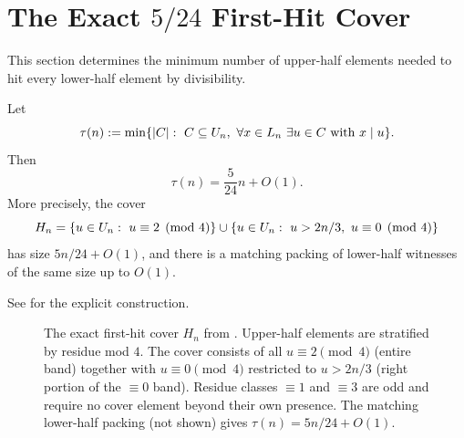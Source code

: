 \section{The Exact \texorpdfstring{$5/24$}{5/24} First-Hit Cover}\label{sec:cover}

This section determines the minimum number of upper-half elements needed to
hit every lower-half element by divisibility.

\begin{theorem}\label{thm:five-twenty-four}
Let
\[
  \tau(n):=\min\{|C|:\ C\subseteq\U_n,\ \forall x\in L_n\ \exists u\in C
  \text{ with }x\mid u\}.
\]
Then
\[
  \tau(n)=\frac{5}{24}n+O(1).
\]
More precisely, the cover
\[
  H_n=\{u\in\U_n:\ u\equiv2\pmod4\}
  \cup
  \{u\in\U_n:\ u>2n/3,\ u\equiv0\pmod4\}
\]
has size $5n/24+O(1)$, and there is a matching packing of lower-half
witnesses of the same size up to $O(1)$.
\end{theorem}

See  for the explicit construction.

\begin{figure}[!htbp]
\centering
{}
\caption{The exact first-hit cover $H_n$ from .
Upper-half elements are stratified by residue mod $4$. The cover consists
of all $u \equiv 2 \pmod 4$ (entire band) together with $u \equiv 0 \pmod 4$
restricted to $u > 2n/3$ (right portion of the $\equiv 0$ band). Residue
classes $\equiv 1$ and $\equiv 3$ are odd and require no cover element
beyond their own presence. The matching lower-half packing (not shown)
gives $\tau(n) = 5n/24 + O(1)$.}
\label{fig:cover-5-24}
\end{figure}

